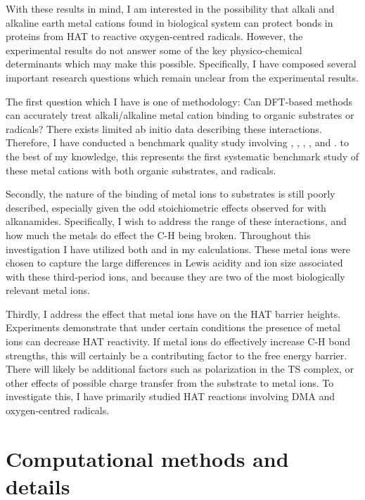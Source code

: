 With these results in mind, I am interested in the possibility that alkali and alkaline earth metal cations found in biological system can protect  bonds in proteins from HAT to reactive oxygen-centred radicals. However, the experimental results do not answer some of the key physico-chemical determinants which may make this possible. Specifically, I have composed several important research questions which remain unclear from the experimental results.

The first question which I have is one of methodology: Can DFT-based methods can accurately treat alkali/alkaline metal cation binding to organic substrates or radicals? There exists limited ab initio data describing these interactions.\cite{ Siu2001, Corral2003, Suarez2011, Baldauf2013} Therefore, I have conducted a benchmark quality study involving , , , , and . to the best of my knowledge, this represents the first systematic benchmark study of these metal cations with both organic substrates, and radicals.

Secondly, the nature of the binding of metal ions to substrates is still poorly described, especially given the odd stoichiometric effects observed for  with alkanamides. Specifically, I wish to address the range of these interactions, and how much the metals do effect the C-H being broken. Throughout this investigation I have utilized both  and  in my calculations. These metal ions were chosen to capture the large differences in Lewis acidity and ion size associated with these third-period ions, and because they are two of the most biologically relevant metal ions.

Thirdly, I address the effect that metal ions have on the HAT barrier heights. Experiments demonstrate that under certain conditions the presence of metal ions can decrease HAT reactivity. If metal ions do effectively increase C-H bond strengths, this will certainly be a contributing factor to the free energy barrier. There will likely be additional factors such as polarization in the TS complex, or other effects of possible charge transfer from the substrate to metal ions. To investigate this, I have primarily studied HAT reactions involving DMA and oxygen-centred radicals.


\section{Computational methods and details}

